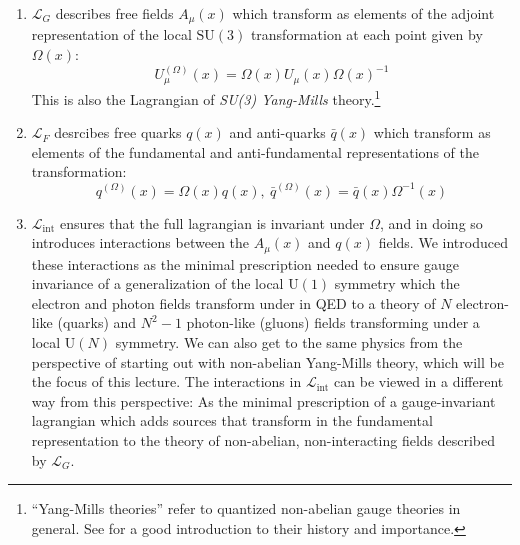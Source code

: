 \documentclass[11pt]{article}
\begin{document}
\begin{enumerate}
\item $\mathcal L_G$ describes free fields $A_\mu(x)$ which transform as elements of the adjoint representation of the local $\mathrm{SU}(3)$ transformation at each point given by $\Omega(x)$:
\begin{equation}U^{(\Omega)}_\mu(x)=\Omega(x)U_\mu(x)\Omega(x)^{-1}\end{equation}
This is also the Lagrangian of \emph{SU(3) Yang-Mills} theory.\footnote{``Yang-Mills theories'' refer to quantized non-abelian gauge theories in general. See \cite{jaffe2006quantum} for a good introduction to their history and importance.}
\item $\mathcal L_F$ desrcibes free quarks $q(x)$ and anti-quarks $\bar q(x)$ which transform as elements of the fundamental and anti-fundamental representations of the transformation:
\begin{equation}q^{(\Omega)}(x)=\Omega(x)q(x),\ \bar q^{(\Omega)}(x)=\bar q(x)\Omega^{-1}(x)\end{equation}
\item $\mathcal L_{\mathrm{int}}$ ensures that the full lagrangian is invariant under $\Omega$, and in doing so introduces interactions between the $A_\mu(x)$ and $q(x)$ fields. We introduced these interactions as the minimal prescription needed to ensure gauge invariance of a generalization of the local $\mathrm{U}(1)$ symmetry which the electron and photon fields transform under in QED to a theory of $N$ electron-like (quarks) and $N^2-1$ photon-like (gluons) fields transforming under a local $\mathrm{U}(N)$ symmetry. We can also get to the same physics from the perspective of starting out with non-abelian Yang-Mills theory, which will be the focus of this lecture. The interactions in $\mathcal L_{\mathrm{int}}$ can be viewed in a different way from this perspective: As the minimal prescription of a gauge-invariant lagrangian which adds sources that transform in the fundamental representation to the theory of non-abelian, non-interacting fields described by $\mathcal L_G$.
\end{enumerate}
\end{document}

